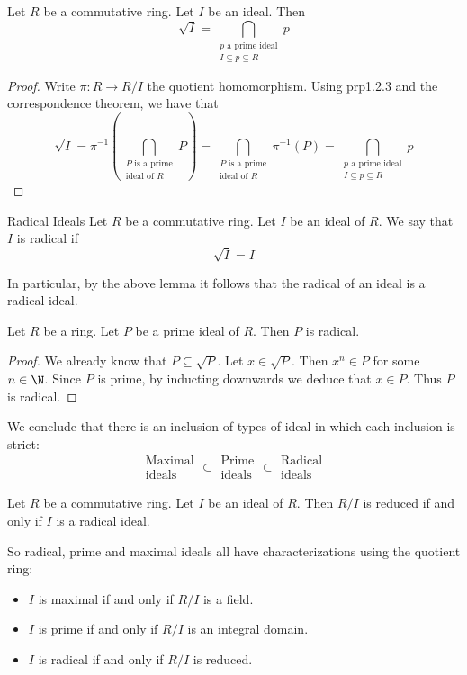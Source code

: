 \documentclass[a4paper]{article}
\begin{document}
\begin{prp}{}{} Let $R$ be a commutative ring. Let $I$ be an ideal. Then $$\sqrt{I}=\bigcap_{\substack{p\text{ a prime ideal}\\I\subseteq p\subseteq R}}p$$ \tcbline
\begin{proof}
Write $\pi:R\to R/I$ the quotient homomorphism. Using prp1.2.3 and the correspondence theorem, we have that $$\sqrt{I}=\pi^{-1}\left(\bigcap_{\substack{P\text{ is a prime}\\\text{ideal of }R}}P\right)=\bigcap_{\substack{P\text{ is a prime}\\\text{ideal of }R}}\pi^{-1}(P)=\bigcap_{\substack{p\text{ a prime ideal}\\I\subseteq p\subseteq R}}p$$
\end{proof}
\end{prp}

\begin{defn}{Radical Ideals}{} Let $R$ be a commutative ring. Let $I$ be an ideal of $R$. We say that $I$ is radical if $$\sqrt{I}=I$$
\end{defn}

In particular, by the above lemma it follows that the radical of an ideal is a radical ideal. 

\begin{lmm}{}{} Let $R$ be a ring. Let $P$ be a prime ideal of $R$. Then $P$ is radical. \tcbline
\begin{proof}
We already know that $P\subseteq\sqrt{P}$. Let $x\in\sqrt{P}$. Then $x^n\in P$ for some $n\in\N$. Since $P$ is prime, by inducting downwards we deduce that $x\in P$. Thus $P$ is radical. 
\end{proof}
\end{lmm}

We conclude that there is an inclusion of types of ideal in which each inclusion is strict: $$\substack{\text{Maximal}\\\text{ideals}}\subset\substack{\text{Prime}\\\text{ideals}}\subset\substack{\text{Radical}\\\text{ideals}}$$

\begin{prp}{}{} Let $R$ be a commutative ring. Let $I$ be an ideal of $R$. Then $R/I$ is reduced if and only if $I$ is a radical ideal. 
\end{prp}

So radical, prime and maximal ideals all have characterizations using the quotient ring: 
\begin{itemize}
\item $I$ is maximal if and only if $R/I$ is a field. 
\item $I$ is prime if and only if $R/I$ is an integral domain. 
\item $I$ is radical if and only if $R/I$ is reduced. 
\end{itemize}
\end{document}
